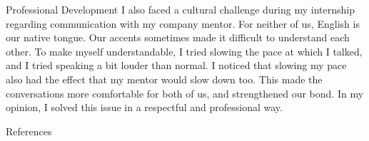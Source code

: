 \documentclass{matthijs}
\begin{document}
\begin{hoofdstuk}{Professional Development}
		I also faced a cultural challenge during my internship regarding communication with my company mentor.
		For neither of us, English is our native tongue.
		Our accents sometimes made it difficult to understand each other.
		To make myself understandable, I tried slowing the pace at which I talked, and I tried speaking a bit louder than normal.
		I noticed that slowing my pace also had the effect that my mentor would slow down too.
		This made the conversations more comfortable for both of us, and strengthened our bond.
		In my opinion, I solved this issue in a respectful and professional way.

	\end{hoofdstuk}

	\begin{hoofdstuk}{References}

		\printbibliography[heading=none]

	\end{hoofdstuk}

	\makelastpage
\end{document}
